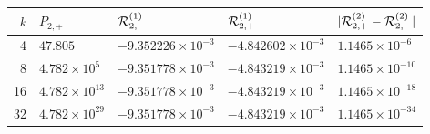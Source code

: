 \begin{tabular}{r@{\qquad}llll}
\toprule
$k$&$P_{2,+}$&$\mathcal R_{2,-}^{(1)}$&$\mathcal R_{2,+}^{(1)}$&$|\mathcal R_{2,+}^{(2)}-\mathcal R_{2,-}^{(2)}|$\\
\midrule
4 & $47.805$ & $-9.352226\times 10^{-3}$ & $-4.842602\times 10^{-3}$ & $1.1465\times 10^{-6}$ \\
8 & $4.782\times 10^{5}$ & $-9.351778\times 10^{-3}$ & $-4.843219\times 10^{-3}$ & $1.1465\times 10^{-10}$ \\
16 & $4.782\times 10^{13}$ & $-9.351778\times 10^{-3}$ & $-4.843219\times 10^{-3}$ & $1.1465\times 10^{-18}$ \\
32 & $4.782\times 10^{29}$ & $-9.351778\times 10^{-3}$ & $-4.843219\times 10^{-3}$ & $1.1465\times 10^{-34}$ \\
\bottomrule
\end{tabular}
